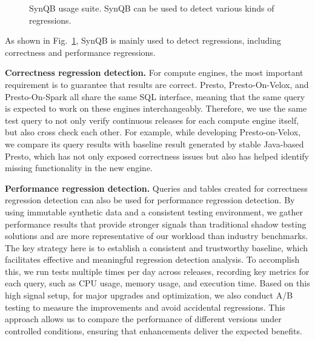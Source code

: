 \documentclass[11pt]{article}
\begin{document}
\begin{figure}[h]
\centering
{}
\caption{SynQB usage suite. SynQB can be used to detect
various kinds of regressions.}
\label{fig:usage}
\end{figure}

As shown in Fig.~\ref{fig:usage}, SynQB is mainly used to detect regressions,
including correctness and performance regressions.

\textbf{Correctness regression detection.} For compute engines, the
most important requirement is to guarantee that results are correct.
Presto, Presto-On-Velox, and Presto-On-Spark all share the same
SQL interface, meaning that the same query is expected to work
on these engines interchangeably. Therefore, we use the same test
query to not only verify continuous releases for each compute
engine itself, but also cross check each other. For example, while
developing Presto-on-Velox, we compare its query results with
baseline result generated by stable Java-based Presto, which has
not only exposed correctness issues but also has helped identify
missing functionality in the new engine.

\textbf{Performance regression detection.} Queries and tables created
for correctness regression detection can also be used for performance
regression detection. By using immutable synthetic data
and a consistent testing environment, we gather performance results
that provide stronger signals than traditional shadow testing
solutions and are more representative of our workload than industry
benchmarks. The key strategy here is to establish a consistent
and trustworthy baseline, which facilitates effective and meaningful
regression detection analysis. To accomplish this, we run tests
multiple times per day across releases, recording key metrics for
each query, such as CPU usage, memory usage, and execution time.
Based on this high signal setup, for major upgrades and optimization,
we also conduct A/B testing to measure the improvements and
avoid accidental regressions. This approach allows us to compare
the performance of different versions under controlled conditions,
ensuring that enhancements deliver the expected benefits.
\end{document}
